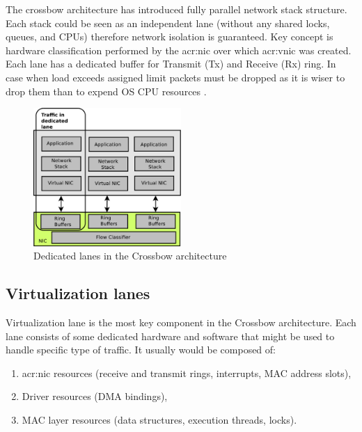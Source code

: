 \documentclass[11pt]{book}
\begin{document}
        The crossbow architecture has introduced fully parallel network stack structure. Each stack could be seen as an
        independent lane (without any shared locks, queues, and CPUs) therefore network isolation is guaranteed.  Key
        concept is hardware classification performed by the \gls{acr:nic} over which \gls{acr:vnic} was created. Each
        lane has a dedicated buffer for Transmit (Tx) and Receive (Rx) ring. In case when load exceeds assigned limit
        packets must be dropped as it is wiser to drop them than to expend OS CPU resources \cite{crossbow}.

        \begin{figure}[H]
          \begin{center}
            \includegraphics[width=0.5\textwidth]{img/crossbow-traffic-dedicated-line.pdf}
          \end{center}

          \caption{Dedicated lanes in the Crossbow architecture}
        \end{figure}

		
      \subsection{Virtualization lanes}

        Virtualization lane is the most key component in the Crossbow architecture. Each lane consists of some dedicated
        hardware and software that might be used to handle specific type of traffic. It usually would be composed of: 

        \begin{enumerate}
          \item \gls{acr:nic} resources (receive and transmit rings, interrupts, MAC address slots),
          \item Driver resources (DMA bindings),
          \item MAC layer resources (data structures, execution threads, locks).
        \end{enumerate}
        
\end{document}
